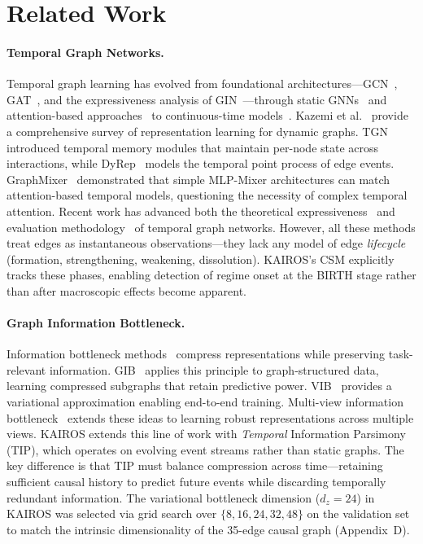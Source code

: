 \documentclass[11pt]{article}
\begin{document}
\section{Related Work}

\paragraph{Temporal Graph Networks.}
Temporal graph learning has evolved from foundational architectures---GCN~\citep{kipf2017gcn}, GAT~\citep{velickovic2018gat}, and the expressiveness analysis of GIN~\citep{xu2019powerful}---through static GNNs~\citep{he2020lightgcn} and attention-based approaches~\citep{xu2020tgat} to continuous-time models~\citep{rossi2020tgn,trivedi2019dyrep}. Kazemi et al.~\citep{kazemi2020dynamic} provide a comprehensive survey of representation learning for dynamic graphs. TGN~\citep{rossi2020tgn} introduced temporal memory modules that maintain per-node state across interactions, while DyRep~\citep{trivedi2019dyrep} models the temporal point process of edge events. GraphMixer~\citep{cong2023graphmixer} demonstrated that simple MLP-Mixer architectures can match attention-based temporal models, questioning the necessity of complex temporal attention. Recent work has advanced both the theoretical expressiveness~\citep{souza2022provably,yu2023towards} and evaluation methodology~\citep{poursafaei2022towards} of temporal graph networks. However, all these methods treat edges as instantaneous observations---they lack any model of edge \emph{lifecycle} (formation, strengthening, weakening, dissolution). KAIROS's CSM explicitly tracks these phases, enabling detection of regime onset at the BIRTH stage rather than after macroscopic effects become apparent.

\paragraph{Graph Information Bottleneck.}
Information bottleneck methods~\citep{tishby2000ib} compress representations while preserving task-relevant information. GIB~\citep{wu2020gib} applies this principle to graph-structured data, learning compressed subgraphs that retain predictive power. VIB~\citep{alemi2017vib} provides a variational approximation enabling end-to-end training. Multi-view information bottleneck~\citep{federici2020multiview} extends these ideas to learning robust representations across multiple views. KAIROS extends this line of work with \emph{Temporal} Information Parsimony (TIP), which operates on evolving event streams rather than static graphs. The key difference is that TIP must balance compression across time---retaining sufficient causal history to predict future events while discarding temporally redundant information. The variational bottleneck dimension ($d_z = 24$) in KAIROS was selected via grid search over $\{8, 16, 24, 32, 48\}$ on the validation set to match the intrinsic dimensionality of the 35-edge causal graph (Appendix~D).
\end{document}
